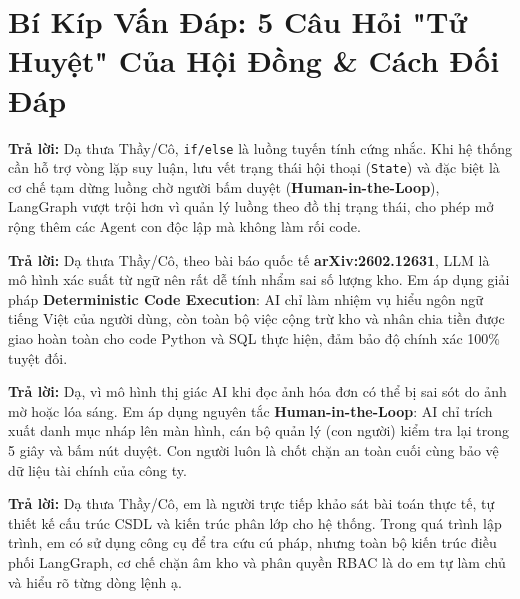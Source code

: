 \documentclass[11pt,a4paper]{article}
\begin{document}
\section{Bí Kíp Vấn Đáp: 5 Câu Hỏi "Tử Huyệt" Của Hội Đồng \& Cách Đối Đáp}

\begin{notebox}
\textbf{Trả lời:} Dạ thưa Thầy/Cô, \texttt{if/else} là luồng tuyến tính cứng nhắc. Khi hệ thống cần hỗ trợ vòng lặp suy luận, lưu vết trạng thái hội thoại (\texttt{State}) và đặc biệt là cơ chế tạm dừng luồng chờ người bấm duyệt (\textbf{Human-in-the-Loop}), LangGraph vượt trội hơn vì quản lý luồng theo đồ thị trạng thái, cho phép mở rộng thêm các Agent con độc lập mà không làm rối code.
\end{notebox}

\begin{notebox}
\textbf{Trả lời:} Dạ thưa Thầy/Cô, theo bài báo quốc tế \textbf{arXiv:2602.12631}, LLM là mô hình xác suất từ ngữ nên rất dễ tính nhẩm sai số lượng kho. Em áp dụng giải pháp \textbf{Deterministic Code Execution}: AI chỉ làm nhiệm vụ hiểu ngôn ngữ tiếng Việt của người dùng, còn toàn bộ việc cộng trừ kho và nhân chia tiền được giao hoàn toàn cho code Python và SQL thực hiện, đảm bảo độ chính xác 100\% tuyệt đối.
\end{notebox}

\begin{notebox}
\textbf{Trả lời:} Dạ, vì mô hình thị giác AI khi đọc ảnh hóa đơn có thể bị sai sót do ảnh mờ hoặc lóa sáng. Em áp dụng nguyên tắc \textbf{Human-in-the-Loop}: AI chỉ trích xuất danh mục nháp lên màn hình, cán bộ quản lý (con người) kiểm tra lại trong 5 giây và bấm nút duyệt. Con người luôn là chốt chặn an toàn cuối cùng bảo vệ dữ liệu tài chính của công ty.
\end{notebox}

\begin{notebox}
\textbf{Trả lời:} Dạ thưa Thầy/Cô, em là người trực tiếp khảo sát bài toán thực tế, tự thiết kế cấu trúc CSDL và kiến trúc phân lớp cho hệ thống. Trong quá trình lập trình, em có sử dụng công cụ để tra cứu cú pháp, nhưng toàn bộ kiến trúc điều phối LangGraph, cơ chế chặn âm kho và phân quyền RBAC là do em tự làm chủ và hiểu rõ từng dòng lệnh ạ.
\end{notebox}
\end{document}
